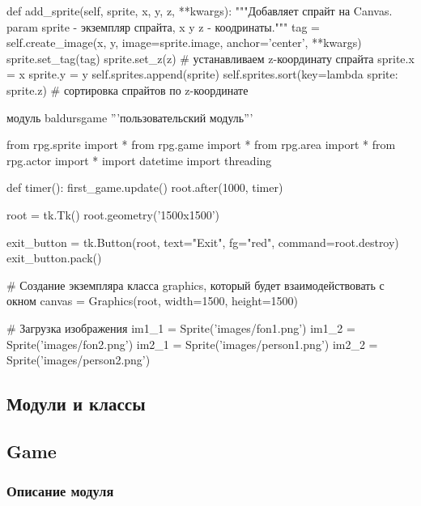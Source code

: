 def add\_sprite(self, sprite, x, y, z, **kwargs):
"""Добавляет спрайт на Canvas.
param sprite - экземпляр спрайта, x y z - коодринаты."""
tag = self.create\_image(x, y, image=sprite.image, anchor='center', **kwargs)
sprite.set\_tag(tag)
sprite.set\_z(z)  \# устанавливаем z-координату спрайта
sprite.x = x
sprite.y = y
self.sprites.append(sprite)
self.sprites.sort(key=lambda sprite: sprite.z) \# сортировка спрайтов по z-координате

модуль baldursgame '''пользовательский модуль'''

from rpg.sprite import *
from rpg.game import *
from rpg.area import *
from rpg.actor import *
import datetime
import threading

def timer():
first\_game.update()
root.after(1000, timer)

root = tk.Tk()
root.geometry('1500x1500')

exit\_button = tk.Button(root, text="Exit", fg="red", command=root.destroy)
exit\_button.pack()

\# Создание экземпляра класса graphics, который будет взаимодействовать с окном
canvas = Graphics(root, width=1500, height=1500)

\# Загрузка изображения
im1\_1 = Sprite('images/fon1.png')
im1\_2 = Sprite('images/fon2.png')
im2\_1 = Sprite('images/person1.png')
im2\_2 = Sprite('images/person2.png')

\subsection{Модули и классы}
\subsection{Game}
\subsubsection{Описание модуля}

